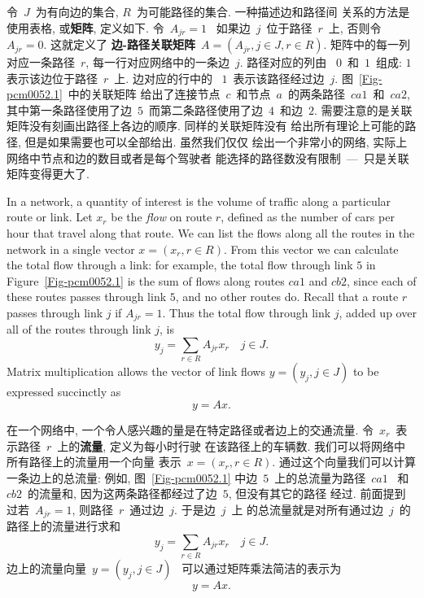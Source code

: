 \documentclass[a4paper,12pt, twocolumn]{article}
\begin{document}
令~$J$~为有向边的集合, $R$~为可能路径的集合. 一种描述边和路径间
关系的方法是使用表格, 或\textbf{矩阵}, 定义如下. 令~$A_{jr}=1$~
如果边~$j$~位于路径~$r$~上, 否则令~$A_{jr}=0$. 这就定义了
\textbf{边-路径关联矩阵}~$A=(A_{jr}, j\in J, r\in R)$. 矩阵中的每一列
对应一条路径~$r$, 每一行对应网络中的一条边~$j$. 路径对应的列由
~$0$~和~$1$~组成: $1$表示该边位于路径~$r$~上. 边对应的行中的
~$1$~表示该路径经过边~$j$. 图~\ref{Fig-pcm0052.1}~中的关联矩阵
给出了连接节点~$c$~和节点~$a$~的两条路径~$ca1$~和~$ca2$, 
其中第一条路径使用了边~$5$~而第二条路径使用了边~$4$~和边~$2$. 
需要注意的是关联矩阵没有刻画出路径上各边的顺序. 同样的关联矩阵没有
给出所有理论上可能的路径, 但是如果需要也可以全部给出. 虽然我们仅仅
绘出一个非常小的网络, 实际上网络中节点和边的数目或者是每个驾驶者
能选择的路径数没有限制~---~只是关联矩阵变得更大了. 

In a network, a quantity of interest is the volume of traffic 
along  a particular route or link.
Let $x_r$ be the {\em flow\/} on route $r$, defined as the
number of cars per hour that travel along that route. 
We can list the flows along all the
routes in the network in a single vector $x =(x_r,r \in R)$.
From this vector we can calculate the total flow through a link:
for example, the total flow through link $5$ in Figure~\ref{Fig-pcm0052.1} 
is the sum of flows along routes $ca1$ and $cb2$, since each of
these routes passes through link $5$, and no other routes do.
Recall that a route $r$ passes through link $j$ if
$A_{jr}=1$.  Thus the total
flow through link $j$, added up over all of the routes 
through link $j$, is 
\[
y_j  = \sum_{r \in R} A_{jr} x_r    \quad  j \in J.
\]
Matrix multiplication allows the vector of link flows $y =(y_j,j \in J )$ 
to be expressed succinctly as
\[
y = A x .
\]

在一个网络中, 一个令人感兴趣的量是在特定路径或者边上的交通流量. 
令~$x_{r}$~表示路径~$r$~上的\textbf{流量}, 定义为每小时行驶
在该路径上的车辆数. 我们可以将网络中所有路径上的流量用一个向量
表示~$x =(x_r,r \in R)$. 通过这个向量我们可以计算一条边上的总流量: 
例如, 图~\ref{Fig-pcm0052.1} 中边~$5$~上的总流量为路径~$ca1$~
和~$cb2$~的流量和, 因为这两条路径都经过了边~$5$, 但没有其它的路径
经过. 前面提到过若~$A_{jr}=1$, 则路径~$r$~通过边~$j$. 于是边~$j$~上
的总流量就是对所有通过边~$j$~的路径上的流量进行求和
\[
y_j  = \sum_{r \in R} A_{jr} x_r    \quad  j \in J.
\]
边上的流量向量~$y =(y_j,j \in J )$ ~可以通过矩阵乘法简洁的表示为
\[
y = A x .
\]
\end{document}
